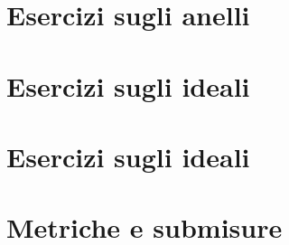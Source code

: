 \section{Esercizi sugli anelli} 
\section{Esercizi sugli ideali} 
\section{Esercizi sugli ideali~} 
\section{Metriche e submisure} 
